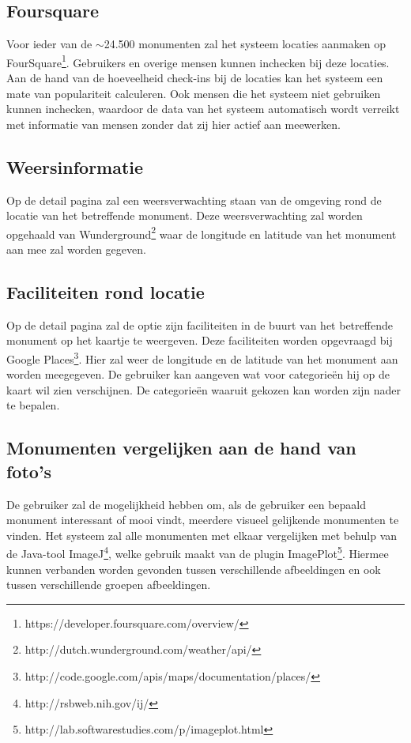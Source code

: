 \documentclass[a4paper,10pt]{article}
\begin{document}
	        \subsection{Foursquare}
			Voor ieder van de $\sim$24.500 monumenten zal het systeem locaties aanmaken op FourSquare\footnote{https://developer.foursquare.com/overview/}. Gebruikers en overige mensen kunnen inchecken bij deze locaties. Aan de hand van de hoeveelheid check-ins bij de locaties kan het systeem een mate van populariteit calculeren. Ook mensen die het systeem niet gebruiken kunnen inchecken, waardoor de data van het systeem automatisch wordt verreikt met informatie van mensen zonder dat zij hier actief aan meewerken.
				
			\subsection{Weersinformatie}
			Op de detail pagina zal een weersverwachting staan van de omgeving rond de locatie van het betreffende monument. Deze weersverwachting zal worden opgehaald van Wunderground\footnote{http://dutch.wunderground.com/weather/api/} waar de longitude en latitude van het monument aan mee zal worden gegeven.
				
			\subsection{Faciliteiten rond locatie}
			Op de detail pagina zal de optie zijn faciliteiten in de buurt van het betreffende monument op het kaartje te weergeven. Deze faciliteiten worden opgevraagd bij Google Places\footnote{http://code.google.com/apis/maps/documentation/places/}. Hier zal weer de longitude en de latitude van het monument aan worden meegegeven. De gebruiker kan aangeven wat voor categorie\"en hij op de kaart wil zien verschijnen. De categorie\"en waaruit gekozen kan worden zijn nader te bepalen.
				
			\subsection{Monumenten vergelijken aan de hand van foto's}
			De gebruiker zal de mogelijkheid hebben om, als de gebruiker een bepaald monument interessant of mooi vindt, meerdere visueel gelijkende monumenten te vinden. Het systeem zal alle monumenten met elkaar vergelijken met behulp van de Java-tool ImageJ\footnote{http://rsbweb.nih.gov/ij/}, welke gebruik maakt van de plugin ImagePlot\footnote{http://lab.softwarestudies.com/p/imageplot.html}. Hiermee kunnen verbanden worden gevonden tussen verschillende afbeeldingen en ook tussen verschillende groepen afbeeldingen.
				
\end{document}
